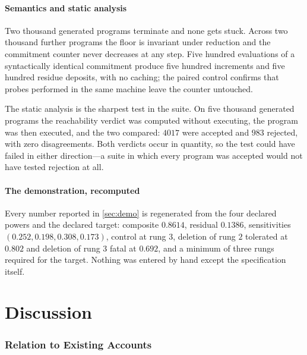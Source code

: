 \documentclass[11pt,twocolumn,a4paper]{article}
\theoremstyle{plain}
\theoremstyle{definition}
\theoremstyle{remark}
\begin{document}
\subsection{Semantics and static analysis}

Two thousand generated programs terminate and none gets stuck. Across two
thousand further programs the floor is invariant under reduction and the
commitment counter never decreases at any step. Five hundred evaluations of a
syntactically identical commitment produce five hundred increments and five
hundred residue deposits, with no caching; the paired control confirms that
probes performed in the same machine leave the counter untouched.

The static analysis is the sharpest test in the suite. On five thousand
generated programs the reachability verdict was computed without executing, the
program was then executed, and the two compared: $4017$ were accepted and $983$
rejected, with zero disagreements. Both verdicts occur in quantity, so the test
could have failed in either direction---a suite in which every program was
accepted would not have tested rejection at all.

\subsection{The demonstration, recomputed}

Every number reported in \cref{sec:demo} is regenerated from the four declared
powers and the declared target: composite $0.8614$, residual $0.1386$,
sensitivities $(0.252, 0.198, 0.308, 0.173)$, control at rung $3$, deletion of
rung $2$ tolerated at $0.802$ and deletion of rung $3$ fatal at $0.692$, and a
minimum of three rungs required for the target. Nothing was entered by hand
except the specification itself.

\part{Discussion}

\section{Relation to Existing Accounts}
\label{sec:relation}
\end{document}

